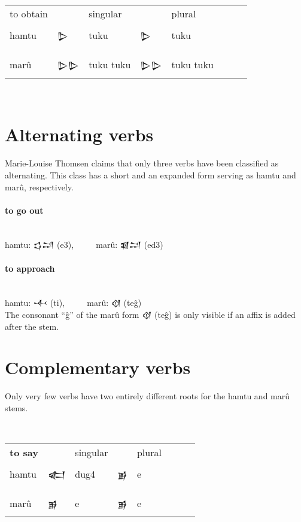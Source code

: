 \documentclass[a4paper,12pt]{book}
\newcommand{\fcn}{\setmainfont{Akkadian.otf}}
\newcommand{\fcm}{\large\setmainfont{Akkadian.otf}}
\begin{document}
\verb||\\
\begin{tabular}[!h]{l l l | l l l l l}
 to obtain && singular && plural \\
  hamtu & {\fcm 𒌇}   & tuku & {\fcm 𒌇}  & tuku \\
&&&&\\
  marû & {\fcm 𒌇𒌇}  & tuku tuku & {\fcm 𒌇𒌇}  & tuku tuku \\
\end{tabular}\verb||\\

\section{Alternating verbs}
Marie-Louise Thomsen claims that only
three verbs have been classified as
alternating. This class has a short
and an expanded form serving as hamtu
and marû, respectively.\\

\paragraph{to go out}\verb||\\
hamtu: {\fcm 𒌓𒁺}  (e3), ~~~~ marû: {\fcm 𒇯𒁺} (ed3)\\

\paragraph{to approach}\verb||\\
hamtu: {\fcm 𒋾} (ti), ~~~~ marû: {\fcm 𒋼} (teĝ)\\ 

The consonant ``ĝ'' of the marû form {\fcn 𒋼} (teĝ)
is only visible if an affix is added after the stem.

\newpage


\section{Complementary verbs}
Only very few verbs have two entirely
different roots for the hamtu and marû
stems.

\verb||\\
\begin{tabular}[!h]{l | l l | l l l l l}
\bf to say && singular && plural \\
  hamtu & {\fcm 𒅗}    & dug4 & {\fcm 𒂊}   & e \\
&&&&\\
  marû & {\fcm 𒂊}   & e & {\fcm 𒂊}   & e \\
\end{tabular}\verb||\\
\end{document}
